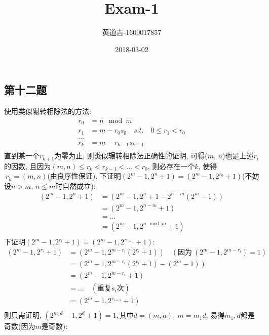 \documentclass{article}
\title{Exam-1}
\date{2018-03-02}
\author{
  \begin{CJK}{UTF8}{gbsn}
    黄道吉-1600017857
  \end{CJK}
}
\begin{document}
\begin{CJK}{UTF8}{gbsn}
\section{第十二题}
  使用类似辗转相除法的方法:
  \begin{equation*}
    \begin{aligned}
      r_0 &= n \mod m \\
      r_1 &= m - r_0s_0\quad  s.t.\quad 0 \leq r_1 < r_0 \\
      \dots & \\
      r_k &= m - r_{k - 1}s_{k - 1} \\
    \end{aligned}
  \end{equation*}
  直到某一个$r_{k + 1}$为零为止, 则类似辗转相除法正确性的证明, 可得($m$, $n$)也是上述$r_i$的因数, 且因为$(m, n) \leq r_k < r_{k - 1} < \dots < r_0$, 则必存在一个$k$, 使得$\ r_k = (m, n)$(由良序性保证).
  \newline
  下证明$(2^m - 1, 2^n + 1) = (2^m - 1, 2^{r_0} + 1)$(不妨设$n > m$, $n \leq m$时自然成立):
  \begin{equation*}
    \begin{aligned}
      (2^m - 1, 2^n + 1) &= (2^m - 1, 2^n + 1 - 2^{n - m}(2^m - 1)) \\
      &= (2^m - 1, 2^{n - m} + 1) \\
      &= \dots \\
      &= (2^m - 1, 2^{n \mod m} + 1) \\
    \end{aligned}
  \end{equation*}
  \newline
  下证明$(2^m - 1, 2^{r_i} + 1) = (2^m - 1, 2^{r_{i + 1}} + 1)$:
  \begin{equation*}
    \begin{aligned}
      (2^m - 1, 2^{r_i} + 1) &= (2^m - 1, 2^{m - r_i}(2^{r_i} + 1)) \quad (\mbox{因为}\ (2^m - 1, 2^{m - r_i}) = 1) \\
      &= (2^m - 1, 2^{m - r_i}(2^{r_i} + 1) - (2^m - 1)) \\
      &= (2^m - 1, 2^{m - r_i} + 1) \\
      &= \dots \quad (\mbox{重复$s_i$次})\\
      &= (2^m - 1, 2^{r_{i + 1}} + 1) \\
    \end{aligned}
  \end{equation*}
  则只需证明, $(2^{m_1d} - 1, 2^d + 1) = 1, $其中$d = (m, n),\ m = m_1d$, 易得$m_1, d$都是奇数(因为$m$是奇数):

\end{CJK}
\end{document}
